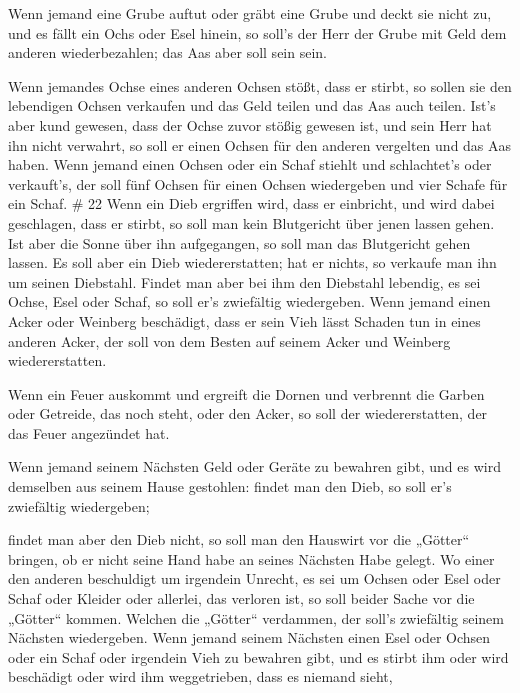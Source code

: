  Wenn jemand eine Grube auftut oder gräbt eine Grube und
deckt sie nicht zu, und es fällt ein Ochs oder Esel hinein,
 so soll's der Herr der Grube mit Geld dem anderen
wiederbezahlen; das Aas aber soll sein sein.

 Wenn jemandes Ochse eines anderen Ochsen stößt, dass er
stirbt, so sollen sie den lebendigen Ochsen verkaufen und das Geld
teilen und das Aas auch teilen.  Ist's aber kund gewesen,
dass der Ochse zuvor stößig gewesen ist, und sein Herr hat ihn nicht
verwahrt, so soll er einen Ochsen für den anderen vergelten und das Aas
haben.  Wenn jemand einen Ochsen oder ein Schaf stiehlt
und schlachtet's oder verkauft's, der soll fünf Ochsen für einen Ochsen
wiedergeben und vier Schafe für ein Schaf. \# 22  Wenn ein
Dieb ergriffen wird, dass er einbricht, und wird dabei geschlagen, dass
er stirbt, so soll man kein Blutgericht über jenen lassen gehen.
 Ist aber die Sonne über ihn aufgegangen, so soll man das
Blutgericht gehen lassen. Es soll aber ein Dieb wiedererstatten; hat er
nichts, so verkaufe man ihn um seinen Diebstahl.  Findet
man aber bei ihm den Diebstahl lebendig, es sei Ochse, Esel oder Schaf,
so soll er's zwiefältig wiedergeben.  Wenn jemand einen
Acker oder Weinberg beschädigt, dass er sein Vieh lässt Schaden tun in
eines anderen Acker, der soll von dem Besten auf seinem Acker und
Weinberg wiedererstatten.

 Wenn ein Feuer auskommt und ergreift die Dornen und
verbrennt die Garben oder Getreide, das noch steht, oder den Acker, so
soll der wiedererstatten, der das Feuer angezündet hat.

 Wenn jemand seinem Nächsten Geld oder Geräte zu bewahren
gibt, und es wird demselben aus seinem Hause gestohlen: findet man den
Dieb, so soll er's zwiefältig wiedergeben;

 findet man aber den Dieb nicht, so soll man den Hauswirt
vor die „Götter`` bringen, ob er nicht seine Hand habe an seines
Nächsten Habe gelegt.  Wo einer den anderen beschuldigt um
irgendein Unrecht, es sei um Ochsen oder Esel oder Schaf oder Kleider
oder allerlei, das verloren ist, so soll beider Sache vor die „Götter``
kommen. Welchen die „Götter`` verdammen, der soll's zwiefältig seinem
Nächsten wiedergeben.  Wenn jemand seinem Nächsten einen
Esel oder Ochsen oder ein Schaf oder irgendein Vieh zu bewahren gibt,
und es stirbt ihm oder wird beschädigt oder wird ihm weggetrieben, dass
es niemand sieht,

